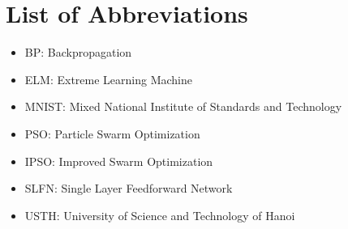 \documentclass[13pt]{article}
\begin{document}
\section*{List of Abbreviations}
\begin{itemize}
    \item BP: Backpropagation
    \item ELM: Extreme Learning Machine
    \item MNIST: Mixed National Institute of Standards and Technology
    \item PSO: Particle Swarm Optimization
    \item IPSO: Improved Swarm Optimization
    \item SLFN: Single Layer Feedforward Network
    \item USTH: University of Science and Technology of Hanoi
\end{itemize}
\newpage
\listoffigures
\listoftables
\newpage
\end{document}
